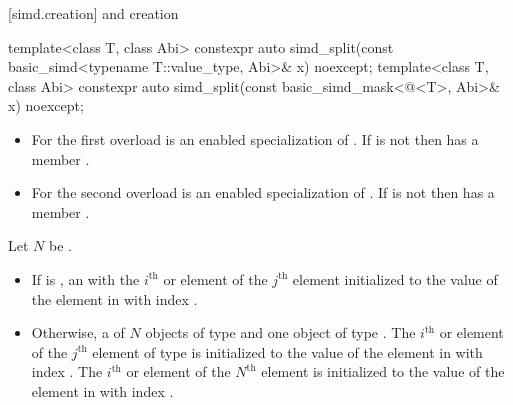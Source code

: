 [simd.creation]{ and  creation}

\begin{itemdecl}
template<class T, class Abi>
  constexpr auto simd_split(const basic_simd<typename T::value_type, Abi>& x) noexcept;
template<class T, class Abi>
  constexpr auto simd_split(const basic_simd_mask<@\maskelementsize@<T>, Abi>& x) noexcept;
\end{itemdecl}

\begin{itemdescr}

  \pnum\constraints
  \begin{itemize}
    \item For the first overload  is an enabled specialization of . If
       is
      not  then  has a member .

    \item For the second overload  is an enabled specialization of .
      If  is not
       then  has a member .
  \end{itemize}

  \pnum Let $N$ be .

    \pnum\returns
    \begin{itemize}
      \item If  is , an  with
        the $i^\text{th}$ \simd or \mask element of the $j^\text{th}$ 
        element initialized to the value of the element in  with index
        .

      \item Otherwise, a  of $N$ objects of type  and one
        object of type .
        The $i^\text{th}$ \simd or \mask element of the $j^\text{th}$
         element of type  is initialized to the value of
        the element in  with index .
        The $i^\text{th}$ \simd or \mask element of the $N^\text{th}$
         element is initialized to the value of the element in
         with index .
    \end{itemize}
  \end{itemdescr}

